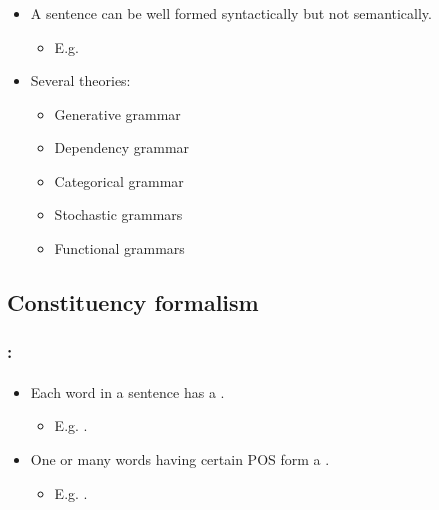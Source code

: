 \documentclass[xcolor=table]{beamer}
\begin{document}
\begin{frame}
	\frametitle{\insertshortsubtitle}
	\framesubtitle{\insertsection}

	\begin{itemize}
		\item A sentence can be well formed syntactically but not semantically.
		\begin{itemize}
			\item E.g. 
		\end{itemize}
		\item Several theories:
		\begin{itemize}
			\item Generative grammar
			\item Dependency grammar
			\item Categorical grammar
			\item Stochastic grammars
			\item Functional grammars
		\end{itemize}
		
	\end{itemize}

\end{frame}

\subsection{Constituency formalism}

\begin{frame}
	\frametitle{\insertshortsubtitle: \insertsection}
	\framesubtitle{\insertsubsection}

	\begin{itemize}
		\item Each word in a sentence has a .
		\begin{itemize}
			\item E.g. .
		\end{itemize}
		\item One or many words having certain POS form a .
		\begin{itemize}
			\item E.g. .
		\end{itemize}
	\end{itemize}
	
	\begin{center}
	\end{center}
	
	

\end{frame}
\end{document}
